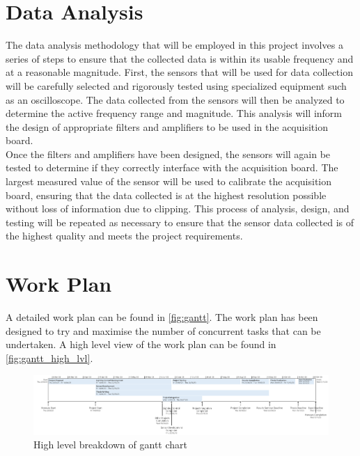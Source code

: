 \section{Data Analysis}
The data analysis methodology that will be employed in this project involves a series of steps
to ensure that the collected data is within its usable frequency and at a reasonable magnitude.
First, the sensors that will be used for data collection will be carefully selected and rigorously tested
using specialized equipment such as an oscilloscope.
The data collected from the sensors will then be analyzed to determine the active frequency range and magnitude.
This analysis will inform the design of appropriate filters and amplifiers to be used in the acquisition board.
\\
Once the filters and amplifiers have been designed, the sensors will again be tested to determine if they correctly interface with the acquisition board.
The largest measured value of the sensor will be used to calibrate the acquisition board,
ensuring that the data collected is at the highest resolution possible without loss of information due to clipping.
This process of analysis, design, and testing will be repeated as necessary
to ensure that the sensor data collected is of the highest quality and meets the project requirements.

\section{Work Plan}
A detailed work plan can be found in \autoref{fig:gantt}.
The work plan has been designed to try and maximise the number of concurrent tasks that can be undertaken.
A high level view of the work plan can be found in \autoref{fig:gantt_high_lvl}.

\begin{figure}[!ht]
    \caption{High level breakdown of gantt chart}\label{fig:gantt_high_lvl}
    \centering
    \includegraphics[width=2\columnwidth]{project_plan/figures/Gantt_Chart_High_Level}
\end{figure}

